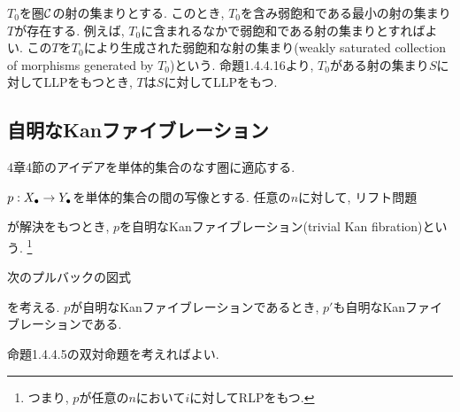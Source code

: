 \documentclass[uplatex, a4paper, 14Q, dvipdfmx]{jsreport}
\begin{document}
\begin{remark}
  $T_0$を圏$\mathcal{C}$の射の集まりとする. 
  このとき, $T_0$を含み弱飽和である最小の射の集まり$T$が存在する. 
  例えば, $T_0$に含まれるなかで弱飽和である射の集まりとすればよい. 
  この$T$を$T_0$により生成された弱飽和な射の集まり(weakly saturated collection of morphisms generated by $T_0$)という.
  命題1.4.4.16より, $T_0$がある射の集まり$S$に対してLLPをもつとき, $T$は$S$に対してLLPをもつ.  
\end{remark}

\subsection{自明なKanファイブレーション}

4章4節のアイデアを単体的集合のなす圏に適応する. 

\begin{definition}
  $p: X_\bullet \to Y_\bullet$を単体的集合の間の写像とする. 
  任意の$n$に対して, リフト問題
  \begin{center}
  \end{center}
  が解決をもつとき, $p$を自明なKanファイブレーション(trivial Kan fibration)という. 
  \footnote{
    つまり, $p$が任意の$n$において$i$に対してRLPをもつ. 
  }
\end{definition}

\begin{remark}
  次のプルバックの図式
  \begin{center}
  \end{center}
  を考える. 
  $p$が自明なKanファイブレーションであるとき, $p'$も自明なKanファイブレーションである.  
\end{remark}

\begin{Proof}
  命題1.4.4.5の双対命題を考えればよい. 
\end{Proof}
\end{document}

